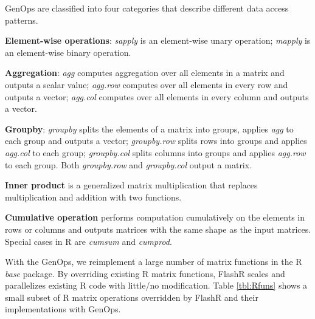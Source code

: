 GenOps are classified into four categories that describe different data access
patterns.

\noindent \textbf{Element-wise operations}:
\textit{sapply} is an element-wise unary operation; \textit{mapply}
is an element-wise binary operation.

\noindent \textbf{Aggregation}: \textit{agg} computes aggregation over
all elements in a matrix and outputs a scalar value; \textit{agg.row}
computes over all elements in every row and outputs a vector;
\textit{agg.col} computes over all elements in every column and
outputs a vector.

\noindent \textbf{Groupby}: \textit{groupby} splits the elements of a matrix
into groups, applies \textit{agg} to each group and outputs a vector;
\textit{groupby.row} splits rows into groups and applies \textit{agg.col}
to each group; \textit{groupby.col} splits columns into groups and applies
\textit{agg.row} to each group. Both \textit{groupby.row} and
\textit{groupby.col} output a matrix.

\noindent \textbf{Inner product} is a generalized matrix multiplication
that replaces multiplication and addition with two functions.

\noindent \textbf{Cumulative operation} performs computation cumulatively
on the elements in rows or columns and outputs matrices with the same
shape as the input matrices. Special cases in R are \textit{cumsum} and
\textit{cumprod}.

With the GenOps, we reimplement a large number of matrix functions in
the R \textit{base} package.
By overriding existing R matrix functions, FlashR scales and parallelizes
existing R code with little/no modification. Table \ref{tbl:Rfuns} shows
a small subset of R matrix operations overridden by FlashR and their
implementations with GenOps.

